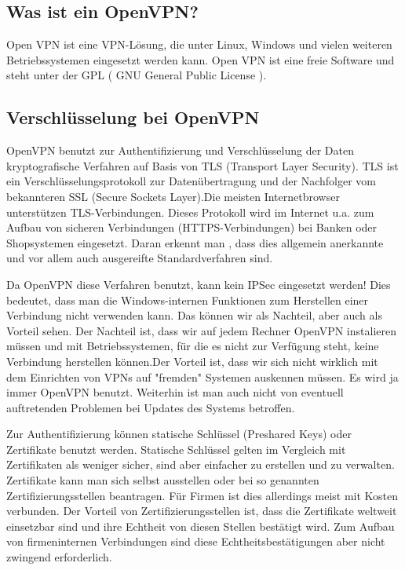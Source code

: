 \documentclass[12pt]{scrartcl}
\begin{document}
\subsection{Was ist ein OpenVPN?}

Open VPN ist eine VPN-Lösung, die unter Linux, Windows und vielen weiteren Betriebssystemen eingesetzt werden kann.
Open VPN ist eine freie Software und steht unter der GPL ( GNU General Public License ).

\subsection{Verschlüsselung bei OpenVPN}

OpenVPN benutzt zur Authentifizierung und Verschlüsselung der Daten kryptografische Verfahren auf Basis von TLS (Transport Layer Security). TLS ist ein Verschlüsselungsprotokoll zur Datenübertragung und der Nachfolger vom bekannteren SSL (Secure Sockets Layer).Die meisten Internetbrowser unterstützen TLS-Verbindungen. Dieses Protokoll wird im Internet u.a. zum Aufbau von sicheren Verbindungen  (HTTPS-Verbindungen) bei Banken oder Shopsystemen  eingesetzt. Daran erkennt man , dass dies allgemein anerkannte und vor allem auch ausgereifte  Standardverfahren sind.

Da OpenVPN diese Verfahren benutzt, kann kein IPSec eingesetzt werden! Dies bedeutet, dass man die Windows-internen Funktionen zum Herstellen einer Verbindung nicht verwenden kann. Das können wir als Nachteil, aber auch als Vorteil sehen. Der Nachteil ist, dass wir auf jedem Rechner OpenVPN instalieren müssen und mit Betriebssystemen, für die es nicht zur Verfügung steht, keine Verbindung herstellen können.Der Vorteil ist, dass wir sich nicht wirklich mit dem Einrichten von VPNs auf "fremden" Systemen auskennen müssen. Es wird ja immer OpenVPN benutzt. Weiterhin ist man auch nicht von eventuell auftretenden Problemen bei Updates des Systems betroffen.

Zur Authentifizierung können statische Schlüssel (Preshared Keys) oder Zertifikate benutzt werden. Statische Schlüssel gelten im Vergleich mit Zertifikaten  als weniger sicher, sind aber einfacher zu erstellen und zu verwalten. Zertifikate kann man sich selbst ausstellen oder bei so genannten Zertifizierungsstellen beantragen. Für Firmen ist dies allerdings meist mit Kosten verbunden. Der Vorteil von Zertifizierungsstellen ist, dass die Zertifikate weltweit einsetzbar sind und ihre Echtheit von diesen Stellen bestätigt wird. Zum Aufbau von firmeninternen Verbindungen sind diese Echtheitsbestätigungen aber nicht zwingend erforderlich.
\end{document}
